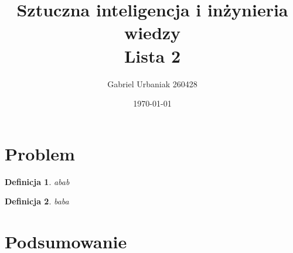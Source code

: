 \documentclass[12pt, a4paper]{article}
\title{Sztuczna inteligencja i inżynieria wiedzy \\ Lista 2}
\author{Gabriel Urbaniak 260428}
\date{\today}
\newtheorem{definicja}{Definicja}
\begin{document}
\maketitle

\section{Problem}
\begin{definicja}
    abab
\end{definicja}

\begin{definicja}
    baba
\end{definicja}

\section{Podsumowanie}
\end{document}

